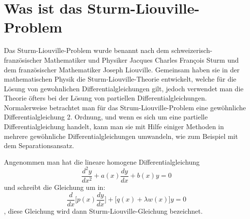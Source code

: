%
%
%
\section{Was ist das Sturm-Liouville-Problem\label{sturmliouville:section:teil0}}
Das Sturm-Liouville-Problem wurde benannt nach dem schweizerisch-französischer Mathematiker und Physiker Jacques Charles Fran\c{c}ois Sturm und dem französischer Mathematiker Joseph Liouville.
Gemeinsam haben sie in der mathematischen Physik die Sturm-Liouville-Theorie entwickelt, welche für die Lösung von gewohnlichen Differentialgleichungen gilt, jedoch verwendet man die Theorie öfters bei der Lösung von partiellen Differentialgleichungen.
Normalerweise betrachtet man für das Strum-Liouville-Problem eine gewöhnliche Differentialgleichung 2. Ordnung, und wenn es sich um eine partielle Differentialgleichung handelt, kann man sie mit Hilfe einiger Methoden in mehrere gewöhnliche Differentialgleichungen umwandeln, wie zum Beispiel mit dem Separationsansatz.

\begin{definition}
Angenommen man hat die lineare homogene Differentialgleichung
\[
	\frac{d^2y}{dx^2} + a(x)\frac{dy}{dx} + b(x)y = 0
\]
und schreibt die Gleichung um in:
\begin{equation}
	\label{eq:sturm-liouville-equation}
	\frac{d}{dx}\lbrack p(x) \frac{dy}{dx} \rbrack + \lbrack q(x) + \lambda w(x) \rbrack y = 0 
\end{equation}
, diese Gleichung wird dann Sturm-Liouville-Gleichung bezeichnet.
\end{definition}

